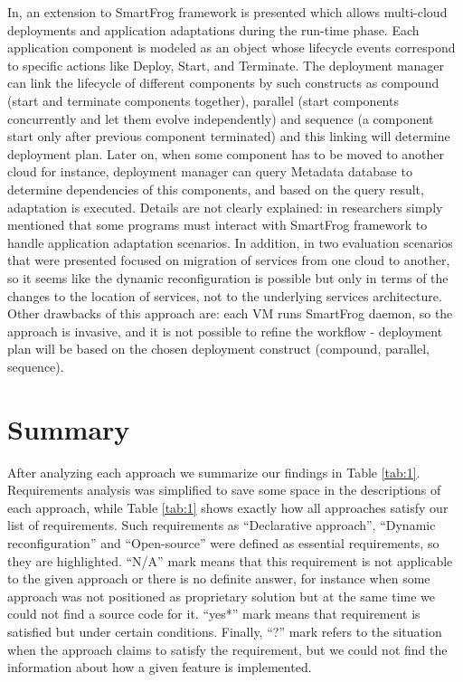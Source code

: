 \noindent In\cite{Frog}, an extension to SmartFrog framework \cite{goldsack2009smartfrog} is presented which allows multi-cloud deployments and application adaptations during the run-time phase. Each application component is modeled as an object whose lifecycle events correspond to specific actions like Deploy, Start, and Terminate. The deployment manager can link the lifecycle of different components by such constructs as compound (start and terminate components together), parallel (start components concurrently and let them evolve independently) and sequence (a component start only after previous component terminated) and this linking will determine deployment plan. Later on, when some component has to be moved to another cloud for instance, deployment manager can query Metadata database to determine dependencies of this components, and based on the query result, adaptation is executed. Details are not clearly explained: in \cite{goldsack2009smartfrog} researchers simply mentioned that some programs must interact with SmartFrog framework to handle application adaptation scenarios. In addition, in \cite{Frog} two evaluation scenarios that were presented focused on migration of services from one cloud to another, so it seems like the dynamic reconfiguration is possible but only in terms of the changes to the location of services, not to the underlying services architecture. Other drawbacks of this approach are: each VM runs SmartFrog daemon, so the approach is invasive, and it is not possible to refine the workflow - deployment plan will be based on the chosen deployment construct (compound, parallel, sequence). 


\section{Summary}

\noindent After analyzing each approach we summarize our findings in Table \ref{tab:1}. Requirements analysis was simplified to save some space in the descriptions of each approach, while Table \ref{tab:1} shows exactly how all approaches satisfy our list of requirements. Such requirements as ``Declarative approach'', ``Dynamic reconfiguration'' and ``Open-source'' were defined as essential requirements, so they are highlighted. ``N/A'' mark means that this requirement is not applicable to the given approach or there is no definite answer, for instance when some approach was not positioned as proprietary solution but at the same time we could not find a source code for it. ``yes*'' mark means that requirement is satisfied but under certain conditions. Finally, ``?'' mark refers to the situation when the approach claims to satisfy the requirement, but we could not find the information about how a given feature is implemented.

